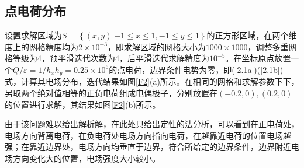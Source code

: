 \documentclass{article} %
\begin{document}
\subsection{点电荷分布}
设置求解区域为$S=\left\{(x,y)|-1\leq x\leq 1,-1\leq y\leq 1\right\}$的正方形区域，在两个维度上的网格精度均为$2\times 10^{-3}$，即求解区域的网格大小为$1000\times 1000$，调整多重网格等级为4，预平滑迭代次数为4，后平滑迭代求解精度为$10^{-5}$。在坐标原点放置一个$Q/\varepsilon=1/h_x h_y=0.25\times 10^{6}$的点电荷，边界条件电势为零，即(\ref{2.1a})(\ref{2.1b})式，计算其电场分布，迭代结果如图\ref{F2}(a)所示。在相同的网格和求解参数下下，另取两个绝对值相等的正负电荷组成电偶极子，分别放置在$(-0.2,0),(0.2,0)$的位置进行求解，其结果如图\ref{F2}(b)所示。

由于该问题难以给出解析解，在此处只给出定性的法分析，可以看到在正电荷处，电场方向背离电荷，在负电荷处电场方向指向电荷，在越靠近电荷的位置电场越强；在靠近边界处，电场方向均垂直于边界，符合所给定的边界条件，边界附近电场方向变化大的位置，电场强度大小较小。
\end{document}
